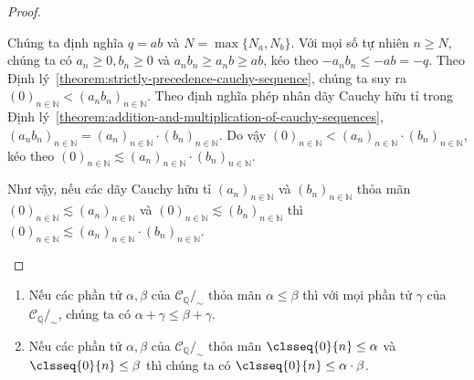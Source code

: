 \begin{proof}
\begin{enumerate}[label={(\roman*)}]
\begin{enumerate}[label={\textbf{Trường hợp \arabic*.}},itemindent=1cm]
                        Chúng ta định nghĩa $q = ab$ và $N = \max\{ N_{a}, N_{b} \}$. Với mọi số tự nhiên $n\geq N$, chúng ta có $a_{n}\geq 0, b_{n}\geq 0$ và $a_{n}b_{n}\geq a_{n}b \geq ab$, kéo theo $-a_{n}b_{n}\leq -ab = -q$. Theo Định lý~\ref{theorem:strictly-precedence-cauchy-sequence}, chúng ta suy ra ${(0)}_{n\in\mathbb{N}} < {(a_{n}b_{n})}_{n\in\mathbb{N}}$. Theo định nghĩa phép nhân dãy Cauchy hữu tỉ trong Định lý~\ref{theorem:addition-and-multiplication-of-cauchy-sequences}, ${(a_{n}b_{n})}_{n\in\mathbb{N}} = {(a_{n})}_{n\in\mathbb{N}}\cdot {(b_{n})}_{n\in\mathbb{N}}$. Do vậy ${(0)}_{n\in\mathbb{N}} < {(a_{n})}_{n\in\mathbb{N}}\cdot {(b_{n})}_{n\in\mathbb{N}}$, kéo theo ${(0)}_{n\in\mathbb{N}} \lesssim {(a_{n})}_{n\in\mathbb{N}}\cdot {(b_{n})}_{n\in\mathbb{N}}$.
              \end{enumerate}

              Như vậy, nếu các dãy Cauchy hữu tỉ ${(a_{n})}_{n\in\mathbb{N}}$ và ${(b_{n})}_{n\in\mathbb{N}}$ thỏa mãn ${(0)}_{n\in\mathbb{N}}\lesssim {(a_{n})}_{n\in\mathbb{N}}$ và ${(0)}_{n\in\mathbb{N}}\lesssim {(b_{n})}_{n\in\mathbb{N}}$ thì ${(0)}_{n\in\mathbb{N}}\lesssim {(a_{n})}_{n\in\mathbb{N}}\cdot {(b_{n})}_{n\in\mathbb{N}}$.
    \end{enumerate}
\end{proof}

\begin{theorem}
    \begin{enumerate}[label={(\roman*)}]
        \item Nếu các phần tử $\alpha, \beta$ của $\mathscr{C}_{\mathbb{Q}}/_{\sim}$ thỏa mãn $\alpha\leq \beta$ thì với mọi phần tử $\gamma$ của $\mathscr{C}_{\mathbb{Q}}/_{\sim}$, chúng ta có $\alpha + \gamma\leq \beta + \gamma$.
        \item Nếu các phần tử $\alpha, \beta$ của $\mathscr{C}_{\mathbb{Q}}/_{\sim}$ thỏa mãn $\clsseq{0}{n} \leq \alpha$ và $\clsseq{0}{n}\leq \beta$ thì chúng ta có $\clsseq{0}{n}\leq \alpha\cdot\beta$.
    \end{enumerate}
\end{theorem}


